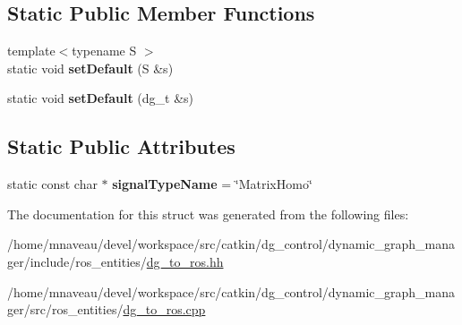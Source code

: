 \subsection*{Static Public Member Functions}
\begin{DoxyCompactItemize}
\item 
{\footnotesize template$<$typename S $>$ }\\static void {\bfseries set\+Default} (S \&s)\hypertarget{structdynamic__graph_1_1DgToRos_3_01MatrixHomogeneous_01_4_aff1ef46b1fcaee004c237c428688cde9}{}\label{structdynamic__graph_1_1DgToRos_3_01MatrixHomogeneous_01_4_aff1ef46b1fcaee004c237c428688cde9}

\item 
static void {\bfseries set\+Default} (dg\+\_\+t \&s)\hypertarget{structdynamic__graph_1_1DgToRos_3_01MatrixHomogeneous_01_4_a5e5e0b9c45f7a25764ae809c1b83eeb9}{}\label{structdynamic__graph_1_1DgToRos_3_01MatrixHomogeneous_01_4_a5e5e0b9c45f7a25764ae809c1b83eeb9}

\end{DoxyCompactItemize}
\subsection*{Static Public Attributes}
\begin{DoxyCompactItemize}
\item 
static const char $\ast$ {\bfseries signal\+Type\+Name} = \char`\"{}Matrix\+Homo\char`\"{}\hypertarget{structdynamic__graph_1_1DgToRos_3_01MatrixHomogeneous_01_4_a4b7828ee5ca8c39150cab5be677d0497}{}\label{structdynamic__graph_1_1DgToRos_3_01MatrixHomogeneous_01_4_a4b7828ee5ca8c39150cab5be677d0497}

\end{DoxyCompactItemize}


The documentation for this struct was generated from the following files\+:\begin{DoxyCompactItemize}
\item 
/home/mnaveau/devel/workspace/src/catkin/dg\+\_\+control/dynamic\+\_\+graph\+\_\+manager/include/ros\+\_\+entities/\hyperlink{dg__to__ros_8hh}{dg\+\_\+to\+\_\+ros.\+hh}\item 
/home/mnaveau/devel/workspace/src/catkin/dg\+\_\+control/dynamic\+\_\+graph\+\_\+manager/src/ros\+\_\+entities/\hyperlink{dg__to__ros_8cpp}{dg\+\_\+to\+\_\+ros.\+cpp}\end{DoxyCompactItemize}
